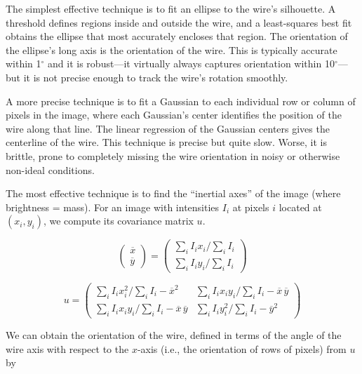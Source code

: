 The simplest effective technique is to fit an ellipse to the wire's silhouette. A threshold defines regions inside and outside the wire, and a least-squares best fit obtains the ellipse that most accurately encloses that region. The orientation of the ellipse's long axis is the orientation of the wire. This is typically accurate within 1$^\circ$ and it is robust---it virtually always captures orientation within 10$^\circ$---but it is not precise enough to track the wire's rotation smoothly.

A more precise technique is to fit a Gaussian to each individual row or column of pixels in the image, where each Gaussian's center identifies the position of the wire along that line. The linear regression of the Gaussian centers gives the centerline of the wire. This technique is precise but quite slow. Worse, it is brittle, prone to completely missing the wire orientation in noisy or otherwise non-ideal conditions.

The most effective technique is to find the ``inertial axes'' of the image (where brightness = mass). For an image with intensities $I_i$ at pixels $i$ located at ${(x_i, y_i)}$, we compute its covariance matrix $u$.

\begin{equation}
\left( \begin{array}{c}
\overline{x} \\
\overline{y} \end{array} \right)
= \left( \begin{array}{c}
\sum_{i} I_i x_i / \sum_i I_i \\
\sum_{i} I_i y_i / \sum_i I_i \end{array} \right)
\end{equation}

\begin{equation}
u = \left( \begin{array}{cc}
\sum_{i} I_i x_i^2 / \sum_i I_i - \overline{x}^2 & \sum_{i} I_i x_i y_i / \sum_i I_i - \overline{x}\,\overline{y} \\
\sum_{i} I_i x_i y_i / \sum_i I_i - \overline{x}\,\overline{y} & \sum_{i} I_i y_i^2 / \sum_i I_i - \overline{y}^2\end{array} \right)
\end{equation}

\noindent We can obtain the orientation of the wire, defined in terms of the angle of the wire axis with respect to the $x$-axis (i.e., the orientation of rows of pixels) from $u$ by


